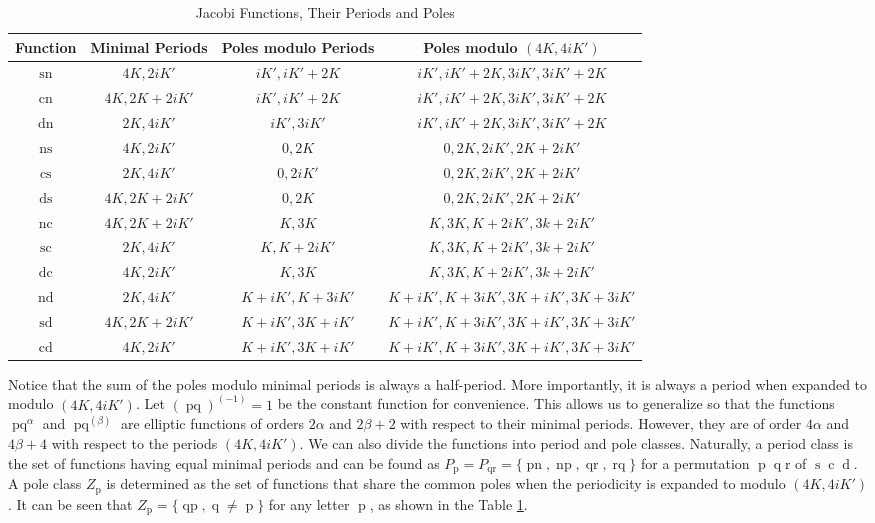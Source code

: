 \documentclass[10pt,a4paper]{amsart}
\DeclareMathOperator{\ns}{ns}
\DeclareMathOperator{\nc}{nc}
\DeclareMathOperator{\dn}{dn}
\DeclareMathOperator{\ds}{ds}
\DeclareMathOperator{\cs}{cs}
\DeclareMathOperator{\sn}{sn}
\DeclareMathOperator{\cn}{cn}
\DeclareMathOperator{\nd}{nd}
\DeclareMathOperator{\scJ}{sc}
\DeclareMathOperator{\cd}{cd}
\DeclareMathOperator{\dc}{dc}
\DeclareMathOperator{\sd}{sd}
\DeclareMathOperator{\pq}{pq}
\DeclareMathOperator{\qp}{qp}
\DeclareMathOperator{\pn}{pn}
\DeclareMathOperator{\np}{np}
\DeclareMathOperator{\qr}{qr}
\DeclareMathOperator{\rqJ}{rq}
\DeclareMathOperator{\p}{p}
\DeclareMathOperator{\q}{q}
\DeclareMathOperator{\s}{s}
\DeclareMathOperator{\cJ}{c}
\DeclareMathOperator{\dJ}{d}
\begin{document}
\begin{center}
\begin{table}[h]
\begin{tabular}{|c|c|c|c|}
\hline
Function & Minimal Periods & Poles modulo Periods & Poles modulo $(4K,4iK')$ \\ \hline
$\sn$ & $4K,2iK'$ & $iK',iK'+2K$ & $iK',iK'+2K,3iK',3iK'+2K$ \\ \hline
$\cn$ & $4K,2K+2iK'$ &  $iK',iK'+2K$ & $iK',iK'+2K,3iK',3iK'+2K$ \\ \hline
$\dn$ & $2K,4iK'$ &  $iK',3iK'$ & $iK',iK'+2K,3iK',3iK'+2K$ \\ \hline
$\ns$ & $4K,2iK'$ & $0,2K$ & $0,2K,2iK',2K+2iK'$ \\ \hline
$\cs$ & $2K,4iK'$ & $0,2iK'$ & $0,2K,2iK',2K+2iK'$ \\ \hline
$\ds$ & $4K,2K+2iK'$ & $0,2K$ & $0,2K,2iK',2K+2iK'$ \\ \hline
$\nc$ & $4K,2K+2iK'$ & $K,3K$ & $K,3K,K+2iK',3k+2iK'$ \\ \hline
$\scJ$ & $2K,4iK'$ & $K,K+2iK'$ & $K,3K,K+2iK',3k+2iK'$ \\ \hline
$\dc$ & $4K,2iK'$ & $K,3K$ & $K,3K,K+2iK',3k+2iK'$ \\ \hline
$\nd$ & $2K,4iK'$ & $K+iK',K+3iK'$ & $K+iK',K+3iK',3K+iK',3K+3iK'$ \\ \hline
$\sd$ & $4K,2K+2iK'$ & $K+iK',3K+iK'$ & $K+iK',K+3iK',3K+iK',3K+3iK'$ \\ \hline
$\cd$ & $4K,2iK'$ & $K+iK',3K+iK'$ & $K+iK',K+3iK',3K+iK',3K+3iK'$ \\ \hline
\end{tabular}\medskip
\caption{Jacobi Functions, Their Periods and Poles}
\label{periodtable}
\end{table}
\end{center}
Notice that the sum of the poles modulo minimal periods is always a half-period. More importantly, it is always a period when expanded to modulo $(4K,4iK')$. Let $(\pq)^{(-1)}=1$ be the constant function for convenience. This allows us to generalize so that the functions $\pq^{\alpha}$ and $\pq^{(\beta)}$ are elliptic functions of orders $2\alpha$ and $2\beta+2$ with respect to their minimal periods. However, they are of order $4\alpha$ and $4\beta+4$ with respect to the periods $(4K,4iK')$. We can also divide the functions into period and pole classes. Naturally, a period class is the set of functions having equal minimal periods and can be found as $P_{\p}=P_{\qr}=\{\pn,\np,\qr,\rqJ\}$ for a permutation $\p\q\text{r}$ of $\s\cJ\dJ$. A pole class $Z_{\p}$ is determined as the set of functions that share the common poles when the periodicity is expanded to modulo $(4K,4iK')$. It can be seen that $Z_{\p}=\{\qp, \q\neq \p\}$ for any letter $\p$, as shown in the Table \ref{periodtable}. \medskip
 
\end{document}
